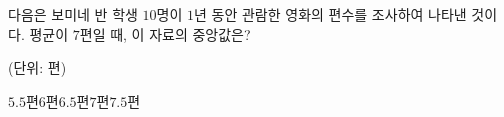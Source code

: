 다음은 보미네 반 학생 $10$명이 $1$년 동안 관람한 영화의 편수를 조사하여 나타낸 것이다. 평균이 $7$편일 때, 이 자료의 중앙값은?\par{\raggedleft\small (단위: 편)\par}
\begin{choices32}{$5.5$편}{$6$편}{$6.5$편}{$7$편}{$7.5$편}\end{choices32}
